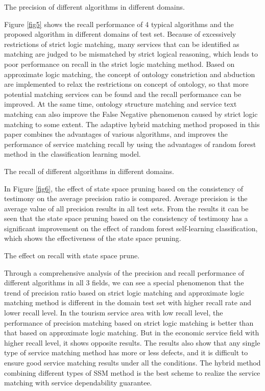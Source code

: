 \documentclass{ieeeaccess}
\begin{document}
{The precision of different algorithms in different domains.
\label{fig4}}

Figure \ref{fig5} shows the recall performance of 4 typical algorithms and the proposed algorithm in different domains of test set. Because of excessively restrictions of strict logic matching, many services that can be identified as matching are judged to be mismatched by strict logical reasoning, which leads to poor performance on recall in the strict logic matching method. Based on approximate logic matching, the concept of ontology constriction and abduction are implemented to relax the restrictions on concept of ontology, so that more potential matching services can be found and the recall performance can be improved. At the same time, ontology structure matching and service text matching can also improve the False Negative phenomenon caused by strict logic matching to some extent. The adaptive hybrid matching method proposed in this paper combines the advantages of various algorithms, and improves the performance of service matching recall by using the advantages of random forest method in the classification learning model.

{The recall of different algorithms in different domains.
\label{fig5}}

In Figure \ref{fig6}, the effect of state space pruning based on the consistency of testimony on the average precision ratio is compared. Average precision is the average value of all precision results in all test sets. From the results it can be seen that the state space pruning based on the consistency of testimony has a significant improvement on the effect of random forest self-learning classification, which shows the effectiveness of the state space pruning.

{The effect on recall with state space prune.
\label{fig6}}

Through a comprehensive analysis of the precision and recall performance of different algorithms in all 3 fields, we can see a special phenomenon that the trend of precision ratio based on strict logic matching and approximate logic matching method is different in the domain test set with higher recall rate and lower recall level. In the tourism service area with low recall level, the performance of precision matching based on strict logic matching is better than that based on approximate logic matching. But in the economic service field with higher recall level, it shows opposite results. The results also show that any single type of service matching method has more or less defects, and it is difficult to ensure good service matching results under all the conditions. The hybrid method combining different types of SSM method is the best scheme to realize the service matching with service dependability guarantee.
\end{document}
